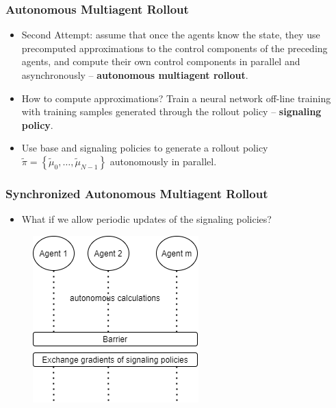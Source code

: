 \documentclass{beamer}
\begin{document}

    \begin{frame}
        \frametitle{Autonomous Multiagent Rollout}
        \begin{itemize}
            \item Second Attempt: assume that once the agents know the
            state, they use precomputed approximations to the control
            components of the preceding agents, and compute their own
            control components in parallel and asynchronously --
            \textbf{autonomous multiagent rollout}.


            \item How to compute approximations? Train a neural network
            off-line training with training samples generated
            through the rollout policy -- \textbf{signaling policy}.


            \item Use base and signaling policies
            to generate a rollout policy
            $\tilde{\pi}=\left\{\tilde{\mu}_{0}, \ldots, \tilde{\mu}_{N-1}\right\}$
            autonomously in parallel.

        \end{itemize}
    \end{frame}





    \begin{frame}
        \frametitle{Synchronized Autonomous Multiagent Rollout}

        \begin{itemize}
            \item What if we allow periodic updates
            of the signaling policies?

        \end{itemize}


        \begin{figure}
            \includegraphics[scale=0.65]{3b_idea}
        \end{figure}


    \end{frame}
\end{document}
